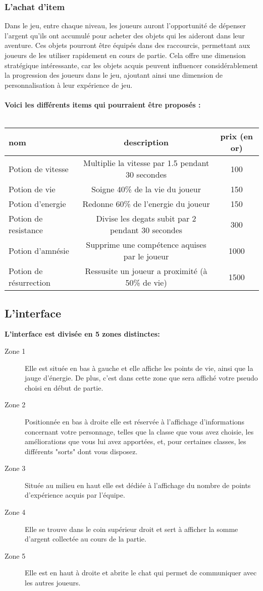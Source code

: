\documentclass{article}
\begin{document}
\subsubsection{L'achat d'item}
Dans le jeu, entre chaque niveau, les joueurs auront l'opportunité de dépenser l'argent qu'ils ont accumulé pour acheter des objets qui les aideront dans leur aventure. Ces objets pourront être équipés dans des raccourcis, permettant aux joueurs de les utiliser rapidement en cours de partie. Cela offre une dimension stratégique intéressante, car les objets acquis peuvent influencer considérablement la progression des joueurs dans le jeu, ajoutant ainsi une dimension de personnalisation à leur expérience de jeu.\\ \\
\textbf{Voici les différents items qui pourraient être proposés :}\\ \\
\begin{tabular}{ | l | c | c | }
 \hline
   \textbf{nom} & \textbf{description} & \textbf{prix (en or)} \\ \hline \hline
    Potion de vitesse & Multiplie la vitesse par 1.5 pendant 30 secondes & 100 \\ \hline
    Potion de vie & Soigne 40\% de la vie du joueur  & 150 \\ \hline 
    Potion d'energie & Redonne 60\% de l'energie du joueur & 150 \\ \hline
    Potion de resistance & Divise les degats subit par 2 pendant 30 secondes & 300 \\ \hline
    Potion d'amnésie & Supprime une compétence aquises par le joueur & 1000 \\ \hline
    Potion de résurrection & Ressusite un joueur a proximité (à 50\% de vie) & 1500 \\ \hline
\end{tabular}

\subsection{L'interface}
\textbf{L'interface est divisée en 5 zones distinctes:}
\begin{description}
\item[Zone 1] Elle est située en bas à gauche et elle affiche les points de vie, ainsi que la jauge d'énergie. De plus, c'est dans cette zone que sera affiché votre pseudo choisi en début de partie.
\item[Zone 2] Positionnée en bas à droite elle est réservée à l'affichage d'informations concernant votre personnage, telles que la classe que vous avez choisie, les améliorations que vous lui avez apportées, et, pour certaines classes, les différents "sorts" dont vous disposez.
\item[Zone 3] Située au milieu en haut elle est dédiée à l'affichage du nombre de points d'expérience acquis par l'équipe. 
\item[Zone 4] Elle se trouve dans le coin supérieur droit et sert à afficher la somme d'argent collectée au cours de la partie.
\item[Zone 5] Elle est en haut à droite et abrite le chat qui permet de communiquer avec les autres joueurs.
\end{description}
\end{document}
